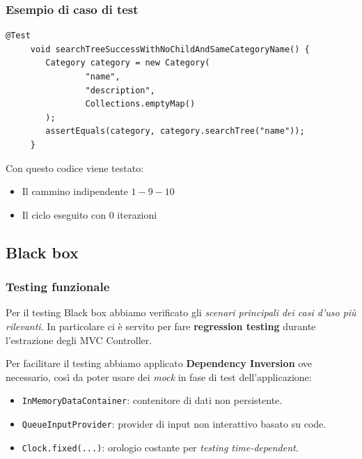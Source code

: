 \begin{frame} [fragile]
    \frametitle{Esempio di caso di test}
    \begin{lstlisting}[autogobble, title={\texttt{CategoryTest.java}}]
     @Test
     void searchTreeSuccessWithNoChildAndSameCategoryName() {
        Category category = new Category(
                "name",
                "description",
                Collections.emptyMap()
        );
        assertEquals(category, category.searchTree("name"));
     }
    \end{lstlisting}
    Con questo codice viene testato:
    \begin{itemize}
        \item Il cammino indipendente $1-9-10$
        \item Il ciclo eseguito con $0$ iterazioni
    \end{itemize}
\end{frame}

\subsection{Black box}
\beamertitle
\begin{frame}
    \frametitle{Testing funzionale}
    Per il testing Black box abbiamo verificato gli \emph{scenari principali dei casi d'uso
    più rilevanti}.
    In particolare ci è servito per fare \textbf{regression testing} durante l'estrazione
    degli MVC Controller.

    Per facilitare il testing abbiamo applicato \textbf{Dependency Inversion} ove necessario, così da poter
    usare dei \emph{mock} in fase di test dell'applicazione:
    \begin{itemize}
        \item \texttt{InMemoryDataContainer}: contenitore di dati non persistente.
        \item \texttt{QueueInputProvider}: provider di input non interattivo basato su code.
        \item \texttt{Clock.fixed(...)}: orologio costante per \emph{testing time-dependent}.
    \end{itemize}
\end{frame}

